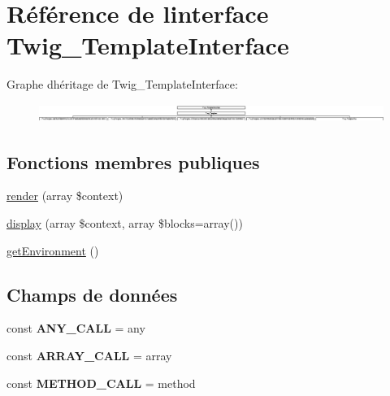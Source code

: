 \hypertarget{interface_twig___template_interface}{}\section{Référence de l\textquotesingle{}interface Twig\+\_\+\+Template\+Interface}
\label{interface_twig___template_interface}
Graphe d\textquotesingle{}héritage de Twig\+\_\+\+Template\+Interface\+:\begin{figure}[H]
\begin{center}
\leavevmode
\includegraphics[height=0.601073cm]{interface_twig___template_interface}
\end{center}
\end{figure}
\subsection*{Fonctions membres publiques}
\begin{DoxyCompactItemize}
\item 
\hyperlink{interface_twig___template_interface_a09fce96a9866b9a2bcba80d611c0199c}{render} (array \$context)
\item 
\hyperlink{interface_twig___template_interface_a056b93bf930a9629d3a96234ce462f20}{display} (array \$context, array \$blocks=array())
\item 
\hyperlink{interface_twig___template_interface_a1a945689f9a90f9029d671ec32262d37}{get\+Environment} ()
\end{DoxyCompactItemize}
\subsection*{Champs de données}
\begin{DoxyCompactItemize}
\item 
const {\bfseries A\+N\+Y\+\_\+\+C\+A\+LL} = \textquotesingle{}any\textquotesingle{}\hypertarget{interface_twig___template_interface_afbad1c07ee4c5a6ab24612dd1e419c80}{}\label{interface_twig___template_interface_afbad1c07ee4c5a6ab24612dd1e419c80}

\item 
const {\bfseries A\+R\+R\+A\+Y\+\_\+\+C\+A\+LL} = \textquotesingle{}array\textquotesingle{}\hypertarget{interface_twig___template_interface_a3458e5e24f091e589f85fdf4e3f270d9}{}\label{interface_twig___template_interface_a3458e5e24f091e589f85fdf4e3f270d9}

\item 
const {\bfseries M\+E\+T\+H\+O\+D\+\_\+\+C\+A\+LL} = \textquotesingle{}method\textquotesingle{}\hypertarget{interface_twig___template_interface_a296b9e68df98717f0c552180d8770665}{}\label{interface_twig___template_interface_a296b9e68df98717f0c552180d8770665}

\end{DoxyCompactItemize}


